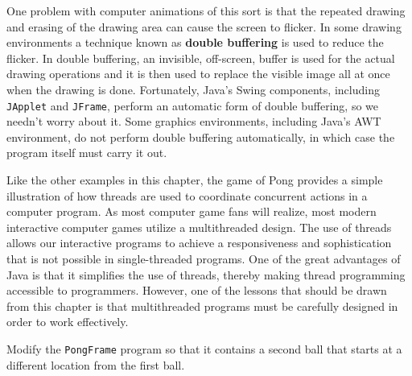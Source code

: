 One problem with computer animations of this sort is that the repeated
drawing and erasing of the drawing area can cause the screen to
flicker. In some drawing environments a technique known as {\bf double
buffering} is used to reduce the flicker. In double buffering, an
invisible, off-screen, buffer is used for the actual drawing
operations and it is then used to replace the visible image all at
once when the drawing is done.  Fortunately, Java's Swing components,
including {\tt JApplet} and {\tt JFrame}, perform an automatic form of
double buffering, so we needn't worry about it.  Some graphics
environments, including Java's AWT environment, do not perform double
buffering automatically, in which case the program itself must carry
it out.

Like the other examples in this chapter, the game of Pong provides a
simple illustration of how threads are used to coordinate concurrent
actions in a computer program. As most computer game fans will
realize, most modern interactive computer games utilize a
multithreaded design. The use of threads allows our interactive
programs to achieve a responsiveness and sophistication that is not
possible in single-threaded programs.  One of the great advantages of
Java is that it simplifies the use of threads, thereby making thread
programming accessible to programmers.  However, one of the lessons
that should be drawn from this chapter is that multithreaded programs
must be carefully designed in order to work effectively.

\label{self-study-exercise}
\begin{SSTUDY}

\item Modify the {\tt PongFrame} program so that it contains a second
ball that starts at a different location from the first ball.

\end{SSTUDY}



\label{chapter-summary}

\label{technical-terms}

